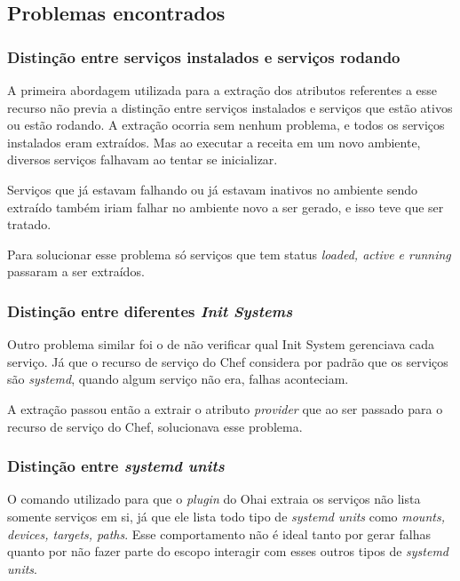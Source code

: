 \noindent\begin{minipage}{\textwidth}
  
\end{minipage}\hfill



\subsection{Problemas encontrados}

\subsubsection{Distinção entre serviços instalados e serviços rodando}
A primeira abordagem utilizada para a extração dos atributos referentes a esse
recurso não previa a distinção entre serviços instalados e serviços que estão
ativos ou estão rodando. A extração ocorria sem nenhum problema, e todos os serviços
instalados eram extraídos. Mas ao executar a receita em um novo ambiente, diversos
serviços falhavam ao tentar se inicializar.

Serviços que já estavam falhando ou já estavam inativos no ambiente sendo extraído
também iriam falhar no ambiente novo a ser gerado, e isso teve que ser tratado.


Para solucionar esse problema só serviços que tem status \textit{loaded, active e running}
passaram a ser extraídos.\

\subsubsection{Distinção entre diferentes \textit{Init Systems}}
Outro problema similar foi o de não verificar qual Init System gerenciava cada
serviço. Já que o recurso de serviço do Chef considera por padrão que os serviços
são \textit{systemd}, quando algum serviço não era, falhas aconteciam.

A extração passou então a extrair o atributo \textit{provider} que ao ser passado
para o recurso de serviço do Chef, solucionava esse problema.

\subsubsection{Distinção entre \textit{systemd units}}
O comando utilizado para que o \textit{plugin} do Ohai extraia os serviços não
lista somente serviços em si, já que ele lista todo tipo de \textit{systemd units}
como \textit{mounts, devices, targets, paths}. Esse comportamento não é ideal
tanto por gerar falhas quanto por não fazer parte do escopo interagir com esses
outros tipos de \textit{systemd units}.

